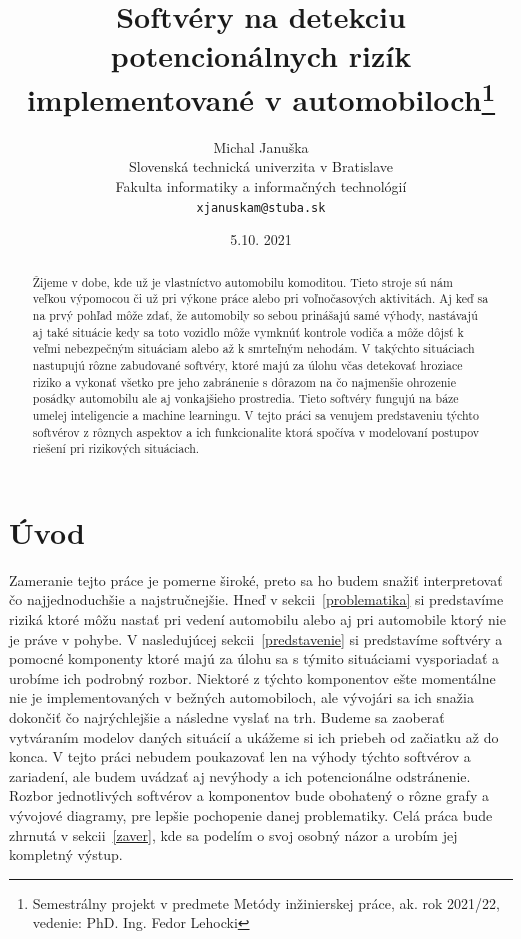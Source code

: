 \documentclass[10pt,oneside,slovak,a4paper]{article}
\title{Softvéry na detekciu potencionálnych rizík 
implementované v automobiloch\thanks{Semestrálny projekt v predmete Metódy inžinierskej práce, ak. rok 2021/22, vedenie: PhD. Ing. Fedor Lehocki  }}
\author{Michal Januška\\[2pt]
	{\small Slovenská technická univerzita v Bratislave}\\
	{\small Fakulta informatiky a informačných technológií}\\
	{\small \texttt{xjanuskam@stuba.sk}}
	}
\date{\small 5.10. 2021}
\begin{document}
\maketitle

\begin{abstract}
Žijeme v dobe, kde už je vlastníctvo automobilu komoditou. Tieto stroje sú nám veľkou výpomocou či už pri výkone práce alebo pri voľnočasových aktivitách. Aj keď sa na prvý pohľad môže zdať, že automobily so sebou prinášajú samé výhody, nastávajú aj také situácie kedy sa toto vozidlo môže vymknúť kontrole vodiča a môže dôjsť  k veľmi nebezpečným situáciam alebo až k smrteľným nehodám. V takýchto situáciach nastupujú rôzne zabudované softvéry, ktoré majú za úlohu včas detekovať hroziace riziko a vykonať všetko pre jeho zabránenie s dôrazom na čo najmenšie ohrozenie posádky automobilu ale aj vonkajšieho prostredia. Tieto softvéry fungujú na báze umelej inteligencie a machine learningu. V tejto práci sa venujem predstaveniu týchto softvérov z rôznych aspektov a ich funkcionalite ktorá spočíva v modelovaní postupov riešení pri rizikových situáciach.
\end{abstract}



\section{Úvod}\label{uvod}

Zameranie tejto práce je pomerne široké, preto sa ho budem snažiť interpretovať čo najjednoduchšie a najstručnejšie. Hneď v sekcii~\ref{problematika} si predstavíme riziká ktoré môžu nastať pri vedení automobilu alebo aj pri automobile ktorý nie je práve v pohybe. V nasledujúcej sekcii~\ref{predstavenie} si predstavíme softvéry a pomocné komponenty ktoré majú za úlohu sa s týmito situáciami vysporiadať a urobíme ich podrobný rozbor. Niektoré z týchto komponentov ešte momentálne nie je implementovaných v bežných automobiloch, ale vývojári sa ich snažia dokončiť čo najrýchlejšie a následne vyslať na trh. Budeme sa zaoberať vytváraním modelov daných situácií a ukážeme si ich priebeh od začiatku až do konca. V tejto práci nebudem poukazovať len na výhody týchto softvérov a zariadení, ale budem uvádzať aj nevýhody a ich potencionálne odstránenie. Rozbor jednotlivých softvérov a komponentov bude obohatený o rôzne grafy a vývojové diagramy, pre lepšie pochopenie danej problematiky. Celá práca bude zhrnutá v sekcii~\ref{zaver}, kde sa podelím o svoj osobný názor a urobím jej kompletný výstup.
\end{document}
